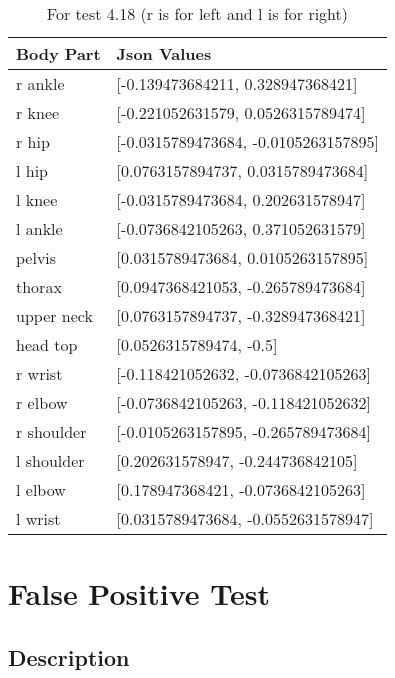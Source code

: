 \documentclass{scrreprt}
\begin{document}
\begin{table}[H]
    \centering
    \caption{For test 4.18 (r is for left and l is for right)}
    \begin{tabular}{||p{2cm}|p{6.5cm}||}
        \hline
        \textbf{Body Part} & \textbf {Json Values}\\
         \hline\hline
        r ankle & [-0.139473684211, 0.328947368421]\\
        \hline
        r knee & [-0.221052631579, 0.0526315789474]\\
        \hline
        r hip & [-0.0315789473684, -0.0105263157895] \\
        \hline
        l hip & [0.0763157894737, 0.0315789473684] \\
        \hline
        l knee & [-0.0315789473684, 0.202631578947] \\
        \hline
        l ankle & [-0.0736842105263, 0.371052631579]\\
        \hline
        pelvis & [0.0315789473684, 0.0105263157895] \\
        \hline
        thorax & [0.0947368421053, -0.265789473684] \\
        \hline
        upper neck & [0.0763157894737, -0.328947368421] \\
        \hline
        head top & [0.0526315789474, -0.5] \\
        \hline
        r wrist & [-0.118421052632, -0.0736842105263]\\
        \hline
        r elbow & [-0.0736842105263, -0.118421052632]\\
        \hline
        r shoulder & [-0.0105263157895, -0.265789473684] \\
        \hline
        l shoulder & [0.202631578947, -0.244736842105] \\
        \hline
        l elbow & [0.178947368421, -0.0736842105263] \\
        \hline
        l wrist & [0.0315789473684, -0.0552631578947] \\
        \hline
    \end{tabular}
\end{table}

\section{False Positive Test}
\subsection{Description}
\end{document}
